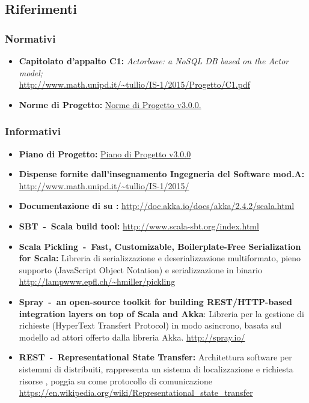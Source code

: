 \documentclass{scalatekids-article}
\begin{document}
\prodPurpose

\glossExpl

\subsection{Riferimenti}

\subsubsection{Normativi}

\begin{itemize}

\item\textbf{Capitolato d'appalto C1:} \textit{Actorbase: a NoSQL DB based on the Actor model;}\\
  \url{http://www.math.unipd.it/~tullio/IS-1/2015/Progetto/C1.pdf}
\item\textbf{Norme di Progetto:}
  \href{run:../Interni/NormeDiProgetto\_v3.0.0.pdf}{Norme di Progetto v3.0.0.}
\end{itemize}

\subsubsection{Informativi}

\begin{itemize}
\item\textbf{Piano di Progetto:} \href{run:./PianoDiProgetto\_v3.0.0.pdf}{Piano di Progetto v3.0.0}
\item\textbf{Dispense fornite dall'insegnamento Ingegneria del Software mod.A:}\\
  \url{http://www.math.unipd.it/~tullio/IS-1/2015/}
\item\textbf{Documentazione di  su :}
  \url{http://doc.akka.io/docs/akka/2.4.2/scala.html}
\item\textbf{SBT\ -\ Scala build tool:}
  \url{http://www.scala-sbt.org/index.html}
\item\textbf{Scala Pickling\ -\ Fast, Customizable, Boilerplate-Free Serialization for Scala:} Libreria di serializzazione e deserializzazione
  multiformato, pieno supporto  (JavaScript Object Notation) e
  serializzazione in binario \url{http://lampwww.epfl.ch/~hmiller/pickling}
\item\textbf{Spray\ -\ an open-source toolkit for building REST/HTTP-based integration layers on top of Scala and Akka}:
  Libreria per la gestione di richieste (HyperText Transfert Protocol) in modo asincrono, basata sul modello ad
  attori offerto dalla libreria Akka. \url{http://spray.io/}
\item\textbf{REST\ -\ Representational State Transfer:} Architettura software
  per sistemmi di  distribuiti, rappresenta un sistema di
  localizzazione e richiesta risorse , poggia su 
  come protocollo di comunicazione \url{https://en.wikipedia.org/wiki/Representational_state_transfer}
\end{itemize}
\end{document}
